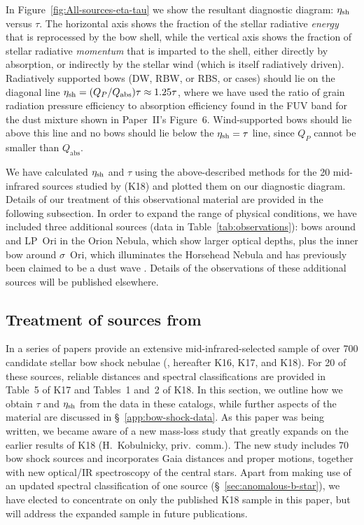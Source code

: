 In Figure~\ref{fig:All-sources-eta-tau} we show the resultant
diagnostic diagram: \(\eta_{\text{sh}}\) versus \(\tau\).  The horizontal axis
shows the fraction of the stellar radiative \emph{energy} that is
reprocessed by the bow shell, while the vertical axis shows the
fraction of stellar radiative \emph{momentum} that is imparted to the
shell, either directly by absorption, or indirectly by the stellar
wind (which is itself radiatively driven).  Radiatively supported bows
(DW, RBW, or RBS, or cases) should lie on the diagonal line
\(\eta_{\text{sh}} = ( Q_P / Q_{\text{abs}}) \tau \approx 1.25 \tau\), where we have used
the ratio of grain radiation pressure efficiency to absorption
efficiency found in the FUV band for the dust mixture shown in
Paper~II's Figure~6.  Wind-supported bows should lie above this line
and no bows should lie below the \(\eta_{\text{sh}} = \tau\) line, since
\(Q_P\) cannot be smaller than \(Q_{\text{abs}}\).

We have calculated \(\eta_{\text{sh}}\) and \(\tau\) using the above-described
methods for the 20 mid-infrared sources studied by
\citet{Kobulnicky:2018a} (K18) and plotted them on our diagnostic
diagram.  Details of our treatment of this observational material are
provided in the following subsection.  In order to expand the range of
physical conditions, we have included three additional sources (data
in Table~\ref{tab:observations}): bows around \thD{}
\citep{Smith:2005a} and LP~Ori \citep{ODell:2001c} in the Orion
Nebula, which show larger optical depths, plus the inner bow around
\(\sigma\)~Ori, which illuminates the Horsehead Nebula and has previously
been claimed to be a dust wave \citep{Ochsendorf:2014b,
  Ochsendorf:2015a}.  Details of the observations of these additional
sources will be published elsewhere.


\subsection{Treatment of sources from \citeauthor{Kobulnicky:2018a}}
\label{sec:kobulnicky}

In a series of papers \citeauthor{Kobulnicky:2018a} provide an
extensive mid-infrared-selected sample of over 700 candidate stellar
bow shock nebulae (\citealp{Kobulnicky:2016a, Kobulnicky:2017a,
  Kobulnicky:2018a}, hereafter K16, K17, and K18).  For 20 of these
sources, reliable distances and spectral classifications are provided
in Table~5 of K17 and Tables~1 and~2 of K18. In this section, we
outline how we obtain \(\tau\) and \(\eta_{\text{sh}}\) from the data in
these catalogs, while further aspects of the
\citeauthor{Kobulnicky:2018a} material are discussed in
\S~\ref{app:bow-shock-data}.  As this paper was being written, we
became aware of a new mass-loss study that greatly expands on the
earlier results of K18 (H.~Kobulnicky, priv.~comm.).  The new study
includes 70 bow shock sources and incorporates Gaia distances and
proper motions, together with new optical/IR spectroscopy of the
central stars.  Apart from making use of an updated spectral
classification of one source (\S~\ref{sec:anomalous-b-star}), we have
elected to concentrate on only the published K18 sample in this paper,
but will address the expanded sample in future publications.

